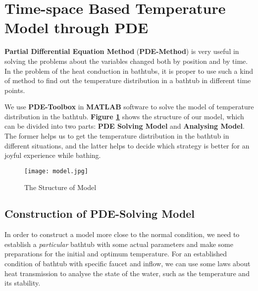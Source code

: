 \documentclass[12pt]{article}
\begin{document}
\section{Time-space Based Temperature Model through PDE}
\textbf{Partial Differential Equation Method} (\textbf{PDE-Method}) \cite{10} is very useful in
solving the problems about the variables changed both by position and by time. In the problem of the
heat conduction in bathtubs, it is proper to use such a kind of method to find out the temperature
distribution in a bathtub in different time points.

We use \textbf{PDE-Toolbox} in \textbf{MATLAB} software to solve the model of temperature
distribution in the bathtub. \textbf{Figure \ref{jj}} shows the structure of our model, which can be
divided into two parts: \textbf{PDE Solving Model} and \textbf{Analysing Model}. The former helps us
to get the temperature distribution in the bathtub in different situations, and the latter helps to
decide which strategy is better for an joyful experience while bathing.
\begin{figure}[!htbp]
    \small
    \centering
    \texttt{[image: model.jpg]}
    \caption{The Structure of Model}\label{jj}
\end{figure}

\subsection{Construction of PDE-Solving Model}
In order to construct a model more close to the normal condition, we need to establish a
\emph{particular} bathtub with some actual parameters and make some preparations for the initial and
optimum temperature. For an established condition of bathtub with specific faucet and inflow, we can
use some laws about heat transmission to analyse the state of the water, such as the temperature and
its stability.
\end{document}
